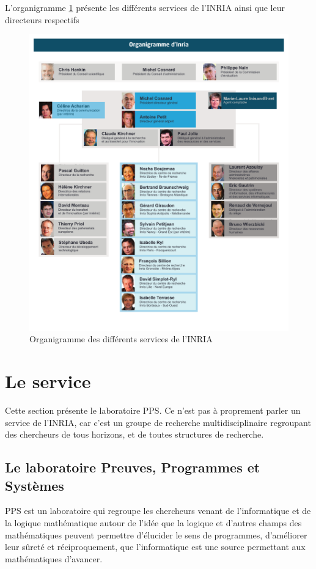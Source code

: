 \documentclass[a4paper, 11pt]{report}
\begin{document}
    L'organigramme \ref{orga} présente les différents services de l'INRIA ainsi
    que leur directeurs respectifs
    \begin{figure}
    \includegraphics[scale=0.85]{data/organigrammeinria.pdf}
    \caption{Organigramme des différents services de l'INRIA}
    \label{orga}
    \end{figure}

  \section{Le service}
  Cette section présente le laboratoire PPS. Ce n'est pas à proprement parler
  un service de l'INRIA, car c'est un groupe de recherche multidisciplinaire
  regroupant des chercheurs de tous horizons, et de toutes structures de
  recherche.
    \subsection{Le laboratoire Preuves, Programmes  et Systèmes}
    PPS est un laboratoire qui regroupe les chercheurs venant de l'informatique
    et de la logique mathématique autour de l'idée que la logique et d'autres
    champs des mathématiques peuvent permettre d'élucider le sens de programmes,
    d'améliorer leur sûreté et réciproquement, que l'informatique est une source
    permettant aux mathématiques d'avancer.
\end{document}
